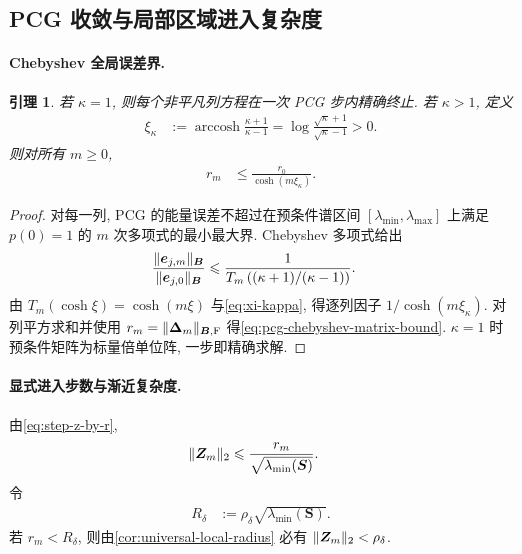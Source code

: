 \documentclass{ctexart}
\newcommand{\dt}{\delta}
\renewcommand{\ge}{\geqslant}
\renewcommand{\le}{\leqslant}
\DeclareMathOperator{\arccosh}{arccosh}
\DeclarePairedDelimiter\norm{\lVert}{\rVert}
\newtheorem{lemma}[theorem]{引理}
\begin{document}
\subsection{PCG 收敛与局部区域进入复杂度}
\label{sec:asymptotic-entry}

\paragraph{Chebyshev 全局误差界.}
\label{subsec:chebyshev-pcg}

\begin{lemma}
\label{lem:pcg-chebyshev-bound}
若 $\kappa=1$, 则每个非平凡列方程在一次 PCG 步内精确终止. 若 $\kappa>1$, 定义
\begin{align}
    \xi_\kappa
    &:=\arccosh\frac{\kappa+1}{\kappa-1}
      =\log\frac{\sqrt\kappa+1}{\sqrt\kappa-1}>0.
    \label{eq:xi-kappa}
\end{align}
则对所有 $m\ge0$,
\begin{align}
    r_m
    &\le\frac{r_0}{\cosh(m\xi_\kappa)}.
    \label{eq:pcg-chebyshev-matrix-bound}
\end{align}
\end{lemma}

\begin{proof}
对每一列, PCG 的能量误差不超过在预条件谱区间
$[\lambda_{\min},\lambda_{\max}]$ 上满足 $p(0)=1$ 的 $m$ 次多项式的最小最大界. Chebyshev 多项式给出
\begin{align}
    \frac{\norm{\bm e_{j,m}}_{\bm B}}
    {\norm{\bm e_{j,0}}_{\bm B}}
    &\le
    \frac1{T_m\left((\kappa+1)/(\kappa-1)\right)}.
    \label{eq:pcg-chebyshev-column}
\end{align}
由 $T_m(\cosh\xi)=\cosh(m\xi)$ 与\cref{eq:xi-kappa}, 得逐列因子 $1/\cosh(m\xi_\kappa)$. 对列平方求和并使用
$r_m=\norm{\bm\Delta_m}_{\bm B,\mathrm F}$ 得\cref{eq:pcg-chebyshev-matrix-bound}. $\kappa=1$ 时预条件矩阵为标量倍单位阵, 一步即精确求解.
\end{proof}

\paragraph{显式进入步数与渐近复杂度.}
\label{subsec:explicit-local-entry}

由\cref{eq:step-z-by-r},
\begin{align}
    \norm{\bm Z_m}_2
    &\le\frac{r_m}{\sqrt{\lambda_{\min}(\bm S)}}.
    \label{eq:Z-by-r-entry}
\end{align}
令
\begin{align}
    R_\dt&:=\rho_\dt\sqrt{\lambda_{\min}(\bm S)}.
    \label{eq:entry-target-radius}
\end{align}
若 $r_m<R_\dt$, 则由\cref{cor:universal-local-radius} 必有
$\norm{\bm Z_m}_2<\rho_\dt$.
\end{document}
